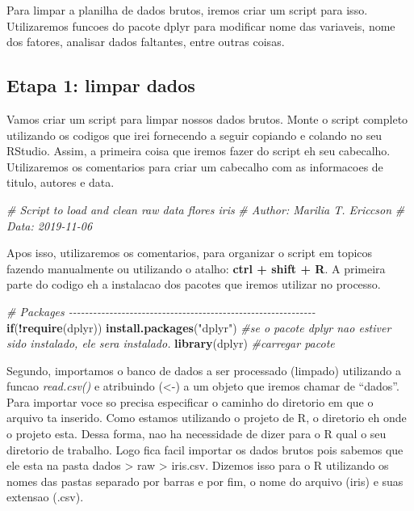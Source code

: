 \documentclass[
]{book}
\newenvironment{Shaded}{\begin{snugshade}}{\end{snugshade}}
\newcommand{\CommentTok}[1]{\textcolor[rgb]{0.56,0.35,0.01}{\textit{#1}}}
\newcommand{\ControlFlowTok}[1]{\textcolor[rgb]{0.13,0.29,0.53}{\textbf{#1}}}
\newcommand{\FunctionTok}[1]{\textcolor[rgb]{0.13,0.29,0.53}{\textbf{#1}}}
\newcommand{\NormalTok}[1]{#1}
\newcommand{\SpecialCharTok}[1]{\textcolor[rgb]{0.81,0.36,0.00}{\textbf{#1}}}
\newcommand{\StringTok}[1]{\textcolor[rgb]{0.31,0.60,0.02}{#1}}
\begin{document}
Para limpar a planilha de dados brutos, iremos criar um script para isso. Utilizaremos funcoes do pacote dplyr para modificar nome das variaveis, nome dos fatores, analisar dados faltantes, entre outras coisas.

\hypertarget{etapa-1-limpar-dados}{%
\subsection{Etapa 1: limpar dados}\label{etapa-1-limpar-dados}}

Vamos criar um script para limpar nossos dados brutos. Monte o script completo utilizando os codigos que irei fornecendo a seguir copiando e colando no seu RStudio. Assim, a primeira coisa que iremos fazer do script eh seu cabecalho. Utilizaremos os comentarios para criar um cabecalho com as informacoes de titulo, autores e data.

\begin{Shaded}
\begin{Highlighting}[]

\CommentTok{\# Script to load and clean raw data flores iris}
\CommentTok{\# Author: Marilia T. Ericcson}
\CommentTok{\# Data: 2019{-}11{-}06}
\end{Highlighting}
\end{Shaded}

Apos isso, utilizaremos os comentarios, para organizar o script em topicos fazendo manualmente ou utilizando o atalho: \textbf{ctrl + shift + R}. A primeira parte do codigo eh a instalacao dos pacotes que iremos utilizar no processo.

\begin{Shaded}
\begin{Highlighting}[]

\CommentTok{\# Packages {-}{-}{-}{-}{-}{-}{-}{-}{-}{-}{-}{-}{-}{-}{-}{-}{-}{-}{-}{-}{-}{-}{-}{-}{-}{-}{-}{-}{-}{-}{-}{-}{-}{-}{-}{-}{-}{-}{-}{-}{-}{-}{-}{-}{-}{-}{-}{-}{-}{-}{-}{-}{-}{-}{-}{-}{-}{-}{-}{-}{-}}
\ControlFlowTok{if}\NormalTok{(}\SpecialCharTok{!}\FunctionTok{require}\NormalTok{(dplyr)) }\FunctionTok{install.packages}\NormalTok{(}\StringTok{"dplyr"}\NormalTok{) }\CommentTok{\#se o pacote dplyr nao estiver sido instalado, ele sera instalado.}
\FunctionTok{library}\NormalTok{(dplyr) }\CommentTok{\#carregar pacote}
\end{Highlighting}
\end{Shaded}

Segundo, importamos o banco de dados a ser processado (limpado) utilizando a funcao \emph{read.csv()} e atribuindo (\textless-) a um objeto que iremos chamar de ``dados''. Para importar voce so precisa especificar o caminho do diretorio em que o arquivo ta inserido. Como estamos utilizando o projeto de R, o diretorio eh onde o projeto esta. Dessa forma, nao ha necessidade de dizer para o R qual o seu diretorio de trabalho. Logo fica facil importar os dados brutos pois sabemos que ele esta na pasta dados \textgreater{} raw \textgreater{} iris.csv. Dizemos isso para o R utilizando os nomes das pastas separado por barras e por fim, o nome do arquivo (iris) e suas extensao (.csv).
\end{document}
